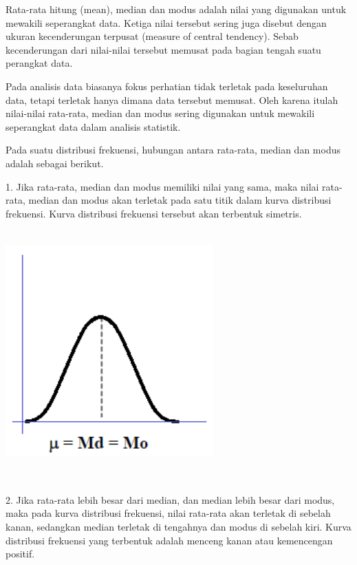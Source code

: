\documentclass[11pt,fleqn]{book} %
\begin{document}
{		Rata-rata hitung (mean), median dan modus adalah nilai yang digunakan untuk mewakili seperangkat data. Ketiga nilai tersebut sering juga disebut dengan ukuran kecenderungan terpusat (measure of central tendency). Sebab kecenderungan dari nilai-nilai tersebut memusat pada bagian tengah suatu perangkat data.

          Pada analisis data biasanya fokus perhatian tidak terletak pada keseluruhan data, tetapi terletak hanya dimana data tersebut memusat. Oleh karena itulah nilai-nilai rata-rata, median dan modus sering digunakan untuk mewakili seperangkat data dalam analisis statistik.

Pada suatu distribusi frekuensi, hubungan antara rata-rata, median dan modus adalah sebagai berikut.

1.	Jika rata-rata, median dan modus memiliki nilai yang sama, maka nilai rata-rata, median dan modus akan terletak pada satu titik dalam kurva distribusi frekuensi. Kurva distribusi frekuensi tersebut akan terbentuk simetris.
\includegraphics[width = 8cm, height= 10cm]{Pictures/rizkie14.png}

2.	Jika rata-rata lebih besar dari median, dan median lebih besar dari modus, maka pada kurva distribusi frekuensi, nilai rata-rata akan terletak di sebelah kanan, sedangkan median terletak di tengahnya dan modus di sebelah kiri. Kurva distribusi frekuensi yang terbentuk adalah menceng kanan atau kemencengan positif.

}
\end{document}
